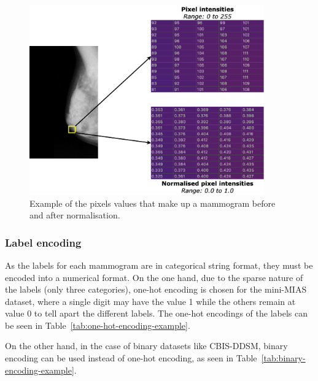 \begin{figure}[ht]
\centerline{\includegraphics[width=0.9\textwidth]{figures/design/Normalisation example.png}}
\caption{\label{fig:design-Normalisation example}Example of the pixels values that make up a mammogram before and after normalisation.}
\end{figure}

\subsubsection{Label encoding}

As the labels for each mammogram are in categorical string format, they must be encoded into a numerical format. On the one hand, due to the sparse nature of the labels (only three categories), one-hot encoding is chosen for the mini-MIAS dataset, where a single digit may have the value 1 while the others remain at value 0 to tell apart the different labels. The one-hot encodings of the labels can be seen in Table~\ref{tab:one-hot-encoding-example}.




On the other hand, in the case of binary datasets like CBIS-DDSM, binary encoding can be used instead of one-hot encoding, as seen in Table~\ref{tab:binary-encoding-example}.

